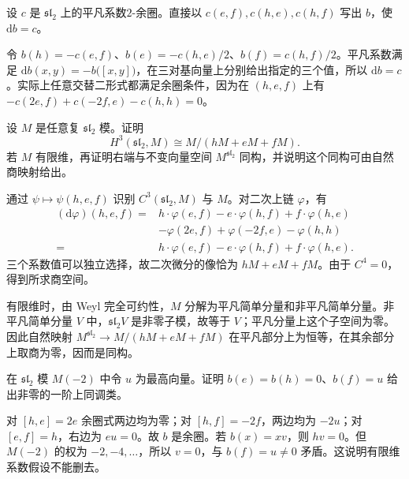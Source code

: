 \begin{optionalexercise}\label{b5:ex:20-sl2-central-cocycle}
	设 \(c\) 是 \(\mathfrak{sl}_2\) 上的平凡系数\(2\)-余圈。直接以 \(c(e,f),c(h,e),c(h,f)\) 写出 \(b\)，使 \(\mathrm{d}b=c\)。
\end{optionalexercise}
\begin{solution}
	令 \(b(h)=-c(e,f)\)、\(b(e)=-c(h,e)/2\)、\(b(f)=c(h,f)/2\)。平凡系数满足 \(\mathrm{d}b(x,y)=-b\bigl([x,y]\bigr)\)，在三对基向量上分别给出指定的三个值，所以 \(\mathrm{d}b=c\)。实际上任意交替二形式都满足余圈条件，因为在 \((h,e,f)\) 上有 \(-c(2e,f)+c(-2f,e)-c(h,h)=0\)。
\end{solution}

\begin{optionalexercise}\label{b5:ex:20-sl2-third-cohomology}
	设 \(M\) 是任意复 \(\mathfrak{sl}_2\) 模。证明
	\[
		H^3(\mathfrak{sl}_2,M) \cong M/(hM+eM+fM).
	\]
	若 \(M\) 有限维，再证明右端与不变向量空间 \(M^{\mathfrak{sl}_2}\) 同构，并说明这个同构可由自然商映射给出。
\end{optionalexercise}
\begin{solution}
	通过 \(\psi\mapsto\psi(h,e,f)\) 识别 \(C^3(\mathfrak{sl}_2,M)\) 与 \(M\)。对二次上链 \(\varphi\)，有
	\begin{align*}
		(\mathrm{d}\varphi)(h,e,f) ={}&h\cdot\varphi(e,f)-e\cdot\varphi(h,f)+f\cdot\varphi(h,e)\\
		&-\varphi(2e,f)+\varphi(-2f,e)-\varphi(h,h)\\
		={}&h\cdot\varphi(e,f)-e\cdot\varphi(h,f)+f\cdot\varphi(h,e).
	\end{align*}
	三个系数值可以独立选择，故二次微分的像恰为 \(hM+eM+fM\)。由于 \(C^4=0\)，得到所求商空间。

	有限维时，由 Weyl 完全可约性，\(M\) 分解为平凡简单分量和非平凡简单分量。非平凡简单分量 \(V\) 中，\(\mathfrak{sl}_2V\) 是非零子模，故等于 \(V\)；平凡分量上这个子空间为零。因此自然映射 \(M^{\mathfrak{sl}_2}\to M/(hM+eM+fM)\) 在平凡部分上为恒等，在其余部分上取商为零，因而是同构。
\end{solution}

\begin{optionalexercise}\label{b5:ex:20-infinite-whitehead-counterexample}
	在 \(\mathfrak{sl}_2\) 模 \(M(-2)\) 中令 \(u\) 为最高向量。证明 \(b(e)=b(h)=0\)、\(b(f)=u\) 给出非零的一阶上同调类。
\end{optionalexercise}
\begin{solution}
	对 \([h,e]=2e\) 余圈式两边均为零；对 \([h,f]=-2f\)，两边均为 \(-2u\)；对 \([e,f]=h\)，右边为 \(eu=0\)。故 \(b\) 是余圈。若 \(b(x)=xv\)，则 \(hv=0\)。但 \(M(-2)\) 的权为 \(-2,-4,\ldots\)，所以 \(v=0\)，与 \(b(f)=u\ne0\) 矛盾。这说明有限维系数假设不能删去。
\end{solution}

